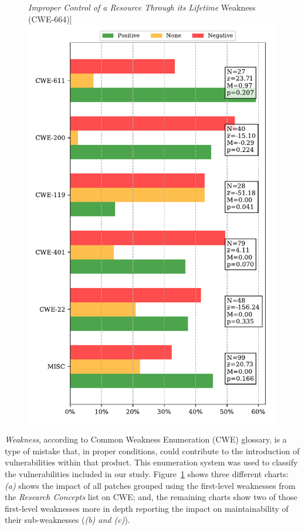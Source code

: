 \documentclass[10pt,conference]{IEEEtran}
\begin{document}
\begin{figure}[htp]
	\textit{Improper Control of a Resource Through its Lifetime} Weakness (CWE-664)]{\includegraphics[scale=0.4]{figures/main_per_cwe_spec_664.pdf}}
	\label{fig:pat}
\end{figure}

\emph{Weakness}, according to Common Weakness Enumeration (CWE) glossary, 
is a type of mistake that, in proper conditions, could contribute to the 
introduction of vulnerabilities within that product. This enumeration
system was used to classify the vulnerabilities included in our study.
Figure~\ref{fig:pat} shows three different charts: \emph{(a)} shows
the impact of all patches grouped using the first-level weaknesses from
the \emph{Research Concepts} list on CWE; and, the remaining charts
show two of those first-level weaknesses more in depth reporting the impact 
on maintainability of their sub-weaknesses (\emph{(b) and (c)}). 
\end{document}
